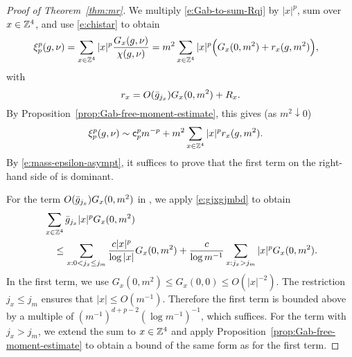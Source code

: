 \begin{proof}[Proof of Theorem~\ref{thm:mr}]
We multiply \eqref{e:Gab-to-sum-Rqj} by $|x|^p$, sum over $x \in {\mathbb Z}^4$,
and use \eqref{e:chistar}
to obtain
\begin{align}
\xi_p^p(g,\nu)
&=
\sum_{x \in {\mathbb Z}^4} |x|^p \frac{G_{x}(g, \nu)}{\chi(g, \nu)}
= m^2 \sum_{x \in {\mathbb Z}^4} |x|^p \Big(G_{x}(0, m^2) + r_{x}(g,m^2) \Big),
\end{align}
with
\begin{equation}
\lbeq{rx}
    r_x = O(\gbar_{j_x})  G_x(0, m^2) + R_{x}.
\end{equation}
By
Proposition~\ref{prop:Gab-free-moment-estimate},
this gives (as $m^2 \downarrow 0$)
\begin{align}
\lbeq{ximasy}
\xi_p^p(g,\nu)
    & \sim
    {\sf c}_p^p m^{-p} +
    m^2 \sum_{x \in \Z^4} |x|^p  r_{x}(g,m^2).
\end{align}
By \eqref{e:mass-epsilon-asympt}, it suffices to prove that
the first term on the right-hand side of  is dominant.

For the term $O(\bar{g}_{j_x}) G_x(0, m^2)$ in ,
we apply \eqref{e:gjxgjmbd} to obtain
\begin{align}
\lbeq{easyerror}
    &\sum_{x \in \Z^4} \gbar_{j_x} |x|^p G_x(0, m^2)
    \nnb & \quad \le
    \sum_{x :  0<  j_x \le j_m} \frac{c |x|^p}{\log |x|} G_x(0, m^2)
    +
    \frac{c}{\log m^{-1}} \sum_{x : j_x >j_m}  |x|^p G_x(0, m^2).
\end{align}
In the first term,
we use $G_x(0, m^2) \le G_x(0, 0) \le O(|x|^{-2})$.  The restriction
$j_x \le j_m$ ensures that $|x| \le O(m^{-1})$.
Therefore the first term is bounded above by a multiple of
$(m^{-1})^{d+p-2}(\log m^{-1})^{-1}$, which suffices.
For the term with $j_x > j_m$, we extend the sum to $x \in {\mathbb Z}^4$
and apply Proposition~\ref{prop:Gab-free-moment-estimate}
to obtain a bound of the same form as for the first term.


\end{proof}
